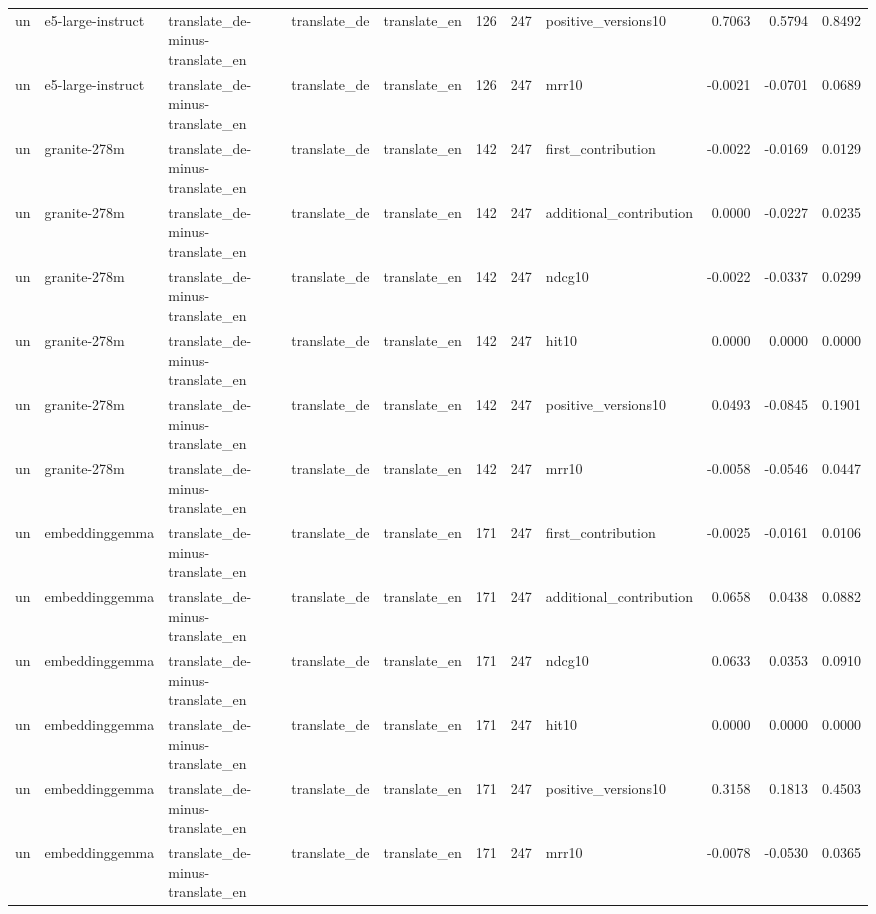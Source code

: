 \begin{tabular}{lllllrrlrrr}
un & e5-large-instruct & translate\_de-minus-translate\_en & translate\_de & translate\_en & 126 & 247 & positive\_versions10 & 0.7063 & 0.5794 & 0.8492 \\
un & e5-large-instruct & translate\_de-minus-translate\_en & translate\_de & translate\_en & 126 & 247 & mrr10 & -0.0021 & -0.0701 & 0.0689 \\
un & granite-278m & translate\_de-minus-translate\_en & translate\_de & translate\_en & 142 & 247 & first\_contribution & -0.0022 & -0.0169 & 0.0129 \\
un & granite-278m & translate\_de-minus-translate\_en & translate\_de & translate\_en & 142 & 247 & additional\_contribution & 0.0000 & -0.0227 & 0.0235 \\
un & granite-278m & translate\_de-minus-translate\_en & translate\_de & translate\_en & 142 & 247 & ndcg10 & -0.0022 & -0.0337 & 0.0299 \\
un & granite-278m & translate\_de-minus-translate\_en & translate\_de & translate\_en & 142 & 247 & hit10 & 0.0000 & 0.0000 & 0.0000 \\
un & granite-278m & translate\_de-minus-translate\_en & translate\_de & translate\_en & 142 & 247 & positive\_versions10 & 0.0493 & -0.0845 & 0.1901 \\
un & granite-278m & translate\_de-minus-translate\_en & translate\_de & translate\_en & 142 & 247 & mrr10 & -0.0058 & -0.0546 & 0.0447 \\
un & embeddinggemma & translate\_de-minus-translate\_en & translate\_de & translate\_en & 171 & 247 & first\_contribution & -0.0025 & -0.0161 & 0.0106 \\
un & embeddinggemma & translate\_de-minus-translate\_en & translate\_de & translate\_en & 171 & 247 & additional\_contribution & 0.0658 & 0.0438 & 0.0882 \\
un & embeddinggemma & translate\_de-minus-translate\_en & translate\_de & translate\_en & 171 & 247 & ndcg10 & 0.0633 & 0.0353 & 0.0910 \\
un & embeddinggemma & translate\_de-minus-translate\_en & translate\_de & translate\_en & 171 & 247 & hit10 & 0.0000 & 0.0000 & 0.0000 \\
un & embeddinggemma & translate\_de-minus-translate\_en & translate\_de & translate\_en & 171 & 247 & positive\_versions10 & 0.3158 & 0.1813 & 0.4503 \\
un & embeddinggemma & translate\_de-minus-translate\_en & translate\_de & translate\_en & 171 & 247 & mrr10 & -0.0078 & -0.0530 & 0.0365 \\

\end{tabular}

